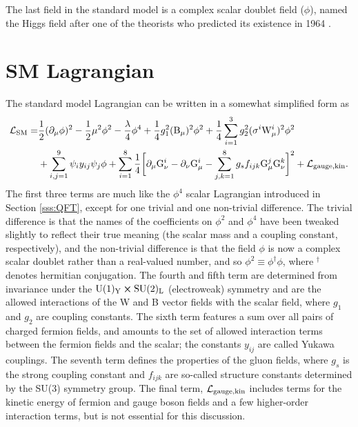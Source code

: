 The last field in the standard model is a complex scalar doublet field ($\phi$), named the Higgs field after one of the theorists who predicted its existence in 1964 \cite{Higgs:1964pj}. 

\section{SM Lagrangian}
The standard model Lagrangian \cite{Langacker:1995hi} can be written in a somewhat simplified form as
\begin{align}
\begin{split}
\mathcal{L}_{\rm SM} =& \frac{1}{2}(\partial_\mu \phi)^2 
- \frac{1}{2}\mu^2\phi^{2}
-\frac{\lambda}{4}\phi^{4}
+\frac{1}{4}g_{1}^{2}({\rm B}_{\mu})^2\phi^2 + \frac{1}{4}\sum_{i=1}^{3}g_{2}^2 (\sigma^{i} {\rm W}^{i}_{\mu})^2\phi^2 \\
&+ \sum_{i,j=1}^{9}\psi_i y_{ij} \psi_{j}\phi
+\sum_{i=1}^{8}\frac{1}{4}\bigg[\partial_\mu {\rm G}^{i}_\nu - \partial_\nu {\rm G}^{i}_\mu - \sum_{j,k=1}^{8}g_s f_{ijk} {\rm G}^{j}_{\mu}{\rm G}^{k}_{\nu}\bigg]^2
+\mathcal{L}_{\rm gauge, kin}.
\end{split}
\end{align}
The first three terms are much like the $\phi^4$ scalar Lagrangian introduced in Section \ref{sss:QFT}, except for one trivial and one non-trivial difference. The trivial difference is that the names of the coefficients on $\phi^2$ and $\phi^4$ have been tweaked slightly to reflect their true meaning (the scalar mass and a coupling constant, respectively), and the non-trivial difference is that the field $\phi$ is now a complex scalar doublet rather than a real-valued number, and so $\phi^2\equiv\phi^{\dag}\phi$, where $^\dag$ denotes hermitian conjugation. The fourth and fifth term are determined from invariance under the $\rm U(1)_{Y}\cross\rm SU(2)_{L}$ (electroweak) symmetry and are the allowed interactions of the W and B vector fields with the scalar field, where $g_{1}$ and $g_{2}$ are coupling constants. The sixth term features a sum over all pairs of charged fermion fields, and amounts to the set of allowed interaction terms between the fermion fields and the scalar; the constants $y_{ij}$ are called Yukawa couplings. The seventh term defines the properties of the gluon fields, where $g_s$ is the strong coupling constant and $f_{ijk}$ are so-called structure constants determined by the SU(3) symmetry group. The final term, $\mathcal{L}_{\rm gauge, kin}$ includes terms for the kinetic energy of fermion and gauge boson fields and a few higher-order interaction terms, but is not essential for this discussion.

